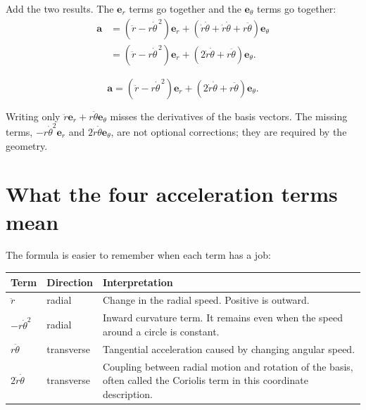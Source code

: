 \documentclass[11pt,a4paper]{article}
\newcommand{\er}{\bm e_r}
\newcommand{\etheta}{\bm e_\theta}
\newcommand{\acc}{\bm a}
\begin{document}
Add the two results. The $\er$ terms go together and the $\etheta$ terms go together:
\begin{align*}
  \acc
  &=\left(\ddot r-r\dot\theta^{\,2}\right)\er
    +\left(\dot r\dot\theta+\dot r\dot\theta+r\ddot\theta\right)\etheta\\
  &=\left(\ddot r-r\dot\theta^{\,2}\right)\er
    +\left(2\dot r\dot\theta+r\ddot\theta\right)\etheta.
\end{align*}

\begin{result}
\[
  \boxed{
  \acc=\left(\ddot r-r\dot\theta^{\,2}\right)\er
  +\left(2\dot r\dot\theta+r\ddot\theta\right)\etheta.}
\]
\end{result}

\begin{notecheck}
Writing only $\ddot r\er+r\ddot\theta\etheta$ misses the derivatives of the basis vectors. The missing terms, $-r\dot\theta^2\er$ and $2\dot r\dot\theta\etheta$, are not optional corrections; they are required by the geometry.
\end{notecheck}

\clearpage

\section{What the four acceleration terms mean}

The formula is easier to remember when each term has a job:

\begin{center}
\renewcommand{\arraystretch}{1.35}
\begin{tabularx}{\textwidth}{>{\raggedright\arraybackslash}p{31mm} >{\raggedright\arraybackslash}p{31mm} X}
\toprule
\textbf{Term} & \textbf{Direction} & \textbf{Interpretation}\\
\midrule
$\ddot r$ & radial & Change in the radial speed. Positive is outward.\\
$-r\dot\theta^2$ & radial & Inward curvature term. It remains even when the speed around a circle is constant.\\
$r\ddot\theta$ & transverse & Tangential acceleration caused by changing angular speed.\\
$2\dot r\dot\theta$ & transverse & Coupling between radial motion and rotation of the basis, often called the Coriolis term in this coordinate description.\\
\bottomrule
\end{tabularx}
\end{center}
\end{document}
